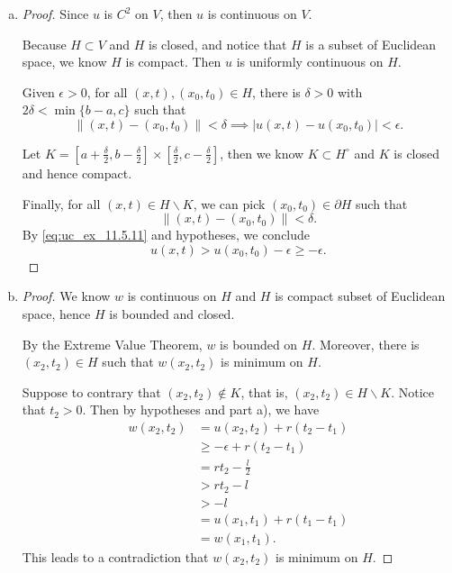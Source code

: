 \begin{Exercise}
\begin{enumerate}[a)]
\item
\begin{proof}
Since $u$ is $C^2$ on $V$, then $u$ is continuous on $V$.

Because $H\subset V$ and $H$ is closed, and notice that $H$ is a subset of Euclidean space, we know $H$ is compact. Then $u$ is uniformly continuous on $H$.

Given $\epsilon>0$, for all $(x,t),(x_0,t_0)\in H$, there is $\delta>0$ with $2\delta<\min\{b-a,c\}$ such that
\begin{equation}
\|(x,t)-(x_0,t_0)\|<\delta \implies |u(x,t)-u(x_0,t_0)|<\epsilon. \label{eq:uc_ex_11.5.11}
\end{equation}

Let $K=\left[a+\frac{\delta}{2},b-\frac{\delta}{2}\right]\times\left[\frac{\delta}{2},c-\frac{\delta}{2}\right]$, then we know $K\subset H^{\circ}$ and $K$ is closed and hence compact.

Finally, for all $(x,t)\in H\backslash K$, we can pick $(x_0,t_0)\in \partial H$ such that 
$$
\|(x,t)-(x_0,t_0)\|<\delta.
$$
By \eqref{eq:uc_ex_11.5.11} and hypotheses, we conclude
$$
u(x,t) > u(x_0,t_0)-\epsilon \geq -\epsilon.
$$
\end{proof}

\item
\begin{proof}
We know $w$ is continuous on $H$ and $H$ is compact subset of Euclidean space, hence $H$ is bounded and closed.

By the Extreme Value Theorem, $w$ is bounded on $H$. Moreover, there is $(x_2,t_2)\in H$ such that $w(x_2,t_2)$ is minimum on $H$.

Suppose to contrary that $(x_2,t_2)\notin K$, that is, $(x_2,t_2)\in H \backslash K$. Notice that $t_2>0$. Then by hypotheses and part a), we have
\begin{align*}
w(x_2,t_2)
&= u(x_2,t_2) + r(t_2-t_1) \\
&\geq -\epsilon+r(t_2-t_1) \\
&=r t_2-\frac{l}{2} \\
&> r t_2 - l \\
&> -l \\
&= u(x_1,t_1) + r(t_1-t_1) \\
&= w(x_1,t_1).
\end{align*}
This leads to a contradiction that $w(x_2,t_2)$ is minimum on $H$.


\end{proof}
\end{enumerate}
\end{Exercise}
